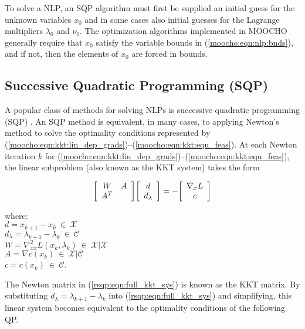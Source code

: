 \documentclass[pdf,ps2pdf,11pt]{SANDreport}
\begin{document}
{{To solve a NLP, an SQP algorithm must first be supplied an initial guess for
the unknown variables $x_0$ and in some cases also initial guesses for the
Lagrange multipliers $\lambda_0$ and $\nu_0$.  The optimization algorithms
implemented in MOOCHO generally require that $x_0$ satisfy the variable bounds
in (\ref{moocho:eqn:nlp:bnds}), and if not, then the elements of $x_0$ are
forced in bounds.

%
\subsection{Successive Quadratic Programming (SQP)}
\label{moocho:sec:SQP}
%

A popular class of methods for solving NLPs is successive quadratic
programming (SQP) {}\cite{ref:boggs_tolle_1996}.  An SQP method is
equivalent, in many cases, to applying Newton's method to solve the
optimality conditions represented by
(\ref{moocho:eqn:kkt:lin_dep_grads})--(\ref{moocho:eqn:kkt:equ_feas}).
At each Newton iteration $k$ for
(\ref{moocho:eqn:kkt:lin_dep_grads})--(\ref{moocho:eqn:kkt:equ_feas}),
the linear subproblem (also known as the KKT system) takes the form

{\bsinglespace
\begin{equation}
{\bmat{cc}
	W    & A \\
	A^T  &
\emat}
{\bmat{c}
	d \\
	d_{\lambda}
\emat}
=
-
{\bmat{c}
	\nabla_x L \\
	c
\emat}
\label{rsqp:eqn:full_kkt_sys}
\end{equation}
\begin{tabbing}
\hspace{4ex}where:\hspace{5ex}\= \\
\>	$d = x_{k+1} - x_k \:\in\:\mathcal{X}$ \\
\>	$d_{\lambda} = \lambda_{k+1} - \lambda_k \:\in\:\mathcal{C}$ \\
\>	$W = \nabla_{xx}^2 L(x_k,\lambda_k) \:\in\:\mathcal{X}|\mathcal{X}$ \\
\>	$A = \nabla c(x_k) \:\in\:\mathcal{X}|\mathcal{C}$ \\
\>	$c = c(x_k) \:\in\:\mathcal{C}$.
\end{tabbing}
\esinglespace}

The Newton matrix in (\ref{rsqp:eqn:full_kkt_sys}) is known as the KKT matrix.
By substituting $d_{\lambda} = {}\lambda_{k+1} - {}\lambda_k$ into
(\ref{rsqp:eqn:full_kkt_sys}) and simplifying, this linear system becomes
equivalent to the optimality conditions of the following QP.

}}
\end{document}
